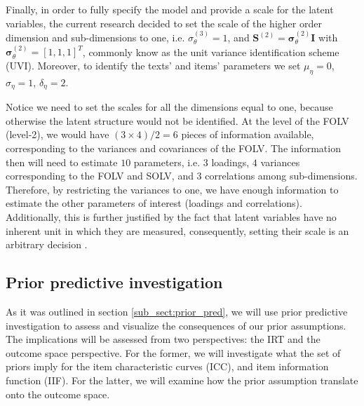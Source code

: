 Finally, in order to fully specify the model and provide a scale for the latent variables, the current research decided to set the scale of the higher order dimension and sub-dimensions to one, i.e. $\sigma^{(3)}_{\theta} = 1$, and $\mathbf{S}^{(2)} = \pmb{\sigma}^{(2)}_{\theta} \mathbf{I}$ with $\pmb{\sigma}^{(2)}_{\theta} = [1, 1, 1]^{T}$, commonly know as the unit variance identification scheme (UVI). Moreover, to identify the texts' and items' parameters we set $\mu_{\eta} = 0$, $\sigma_{\eta}=1$, $\delta_{\eta}=2$.

Notice we need to set the scales for all the dimensions equal to one, because otherwise the latent structure would not be identified. At the level of the FOLV (level-2), we would have $(3 \times 4)/2 = 6$ pieces of information available, corresponding to the variances and covariances of the FOLV. The information then will need to estimate $10$ parameters, i.e. $3$ loadings, $4$ variances corresponding to the FOLV and SOLV, and $3$ correlations among sub-dimensions. Therefore, by restricting the variances to one, we have enough information to estimate the other parameters of interest (loadings and correlations). Additionally, this is further justified by the fact that latent variables have no inherent unit in which they are measured, consequently, setting their scale is an arbitrary  decision \cite{Beaujean_2014}.


\begin{comment}
On the other hand, from the texts and items perspective, at the level of the items (level-2) we would have $(25 \times 26)/2 = 325$ pieces of information available, corresponding to the variances and covariances of the items dimensions. With that information we would need to estimate $30$ parameters, corresponding to $25$ items' dimension variances, and $5$ texts' dimension variances. notice in this case, we do not need to estimate $25$ loadings, as they are assumed to be $1$.
\end{comment}


\subsection{Prior predictive investigation}

As it was outlined in section \ref{sub_sect:prior_pred}, we will use prior predictive investigation to assess and visualize the consequences of our prior assumptions. The implications will be assessed from two perspectives: the IRT and the outcome space perspective. For the former, we will investigate what the set of priors imply for the item characteristic curves (ICC), and item information function (IIF). For the latter, we will examine how the prior assumption translate onto the outcome space.

